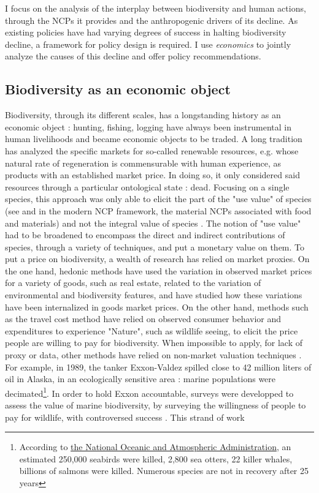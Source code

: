 I focus on the analysis of the interplay between biodiversity and human actions, through the NCPs it provides and the anthropogenic drivers of its decline. As existing policies have had varying degrees of success in halting biodiversity decline, a framework for policy design is required. I use \textit{economics} to jointly analyze the causes of this decline and offer policy recommendations. 


\subsection*{Biodiversity as an economic object}

Biodiversity, through its different scales, has a longstanding history as an economic object : hunting, fishing, logging have always been instrumental in human livelihoods and became economic objects to be traded. A long tradition has analyzed the specific markets for so-called renewable resources, e.g. whose natural rate of regeneration is commensurable with human experience, as products with an established market price. In doing so, it only considered said resources through a particular ontological state : dead. Focusing on a single species, this approach was only able to elicit the part of the "use value" of species (see \cite{Krutilla1967} and in the modern NCP framework, the material NCPs associated with food and materials) and not the integral value of species \citep{Krutilla1967}. The notion of "use value" had to be broadened to encompass the direct and indirect contributions of species, through a variety of techniques, and put a monetary value on them. To put a price on biodiversity, a wealth of research has relied on market proxies. On the one hand, hedonic methods \citep{rosen_hedonic_1974} have used the variation in observed market prices for a variety of goods, such as real estate, related to the variation of environmental and biodiversity features, and have studied how these variations have been internalized in goods market prices. On the other hand, methods such as the travel cost method \citep{clawson_economics_1967, bhandari_willingness_2010} have relied on observed consumer behavior and expenditures to experience "Nature", such as wildlife seeing, to elicit the price people are willing to pay for biodiversity. When impossible to apply, for lack of proxy or data, other methods have relied on non-market valuation techniques \citep{carson_contingent_2012}. For example, in 1989, the tanker Exxon-Valdez spilled close to 42 million liters of oil in Alaska, in an ecologically sensitive area : marine populations were decimated\footnote{According to \href{https://darrp.noaa.gov/oil-spills/exxon-valdez}{the National Oceanic and Atmospheric Administration}, an estimated 250,000 seabirds were killed, 2,800 sea otters, 22 killer whales, billions of salmons were killed. Numerous species are not in recovery after 25 years}. In order to hold Exxon accountable, surveys were developped to assess the value of marine biodiversity, by surveying the willingness of people to pay for wildlife\citep{carson_contingent_1992, arrow_report_1993, carson_contingent_2003}, with controversed success \citep{Diamond94}. This strand of work 